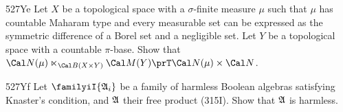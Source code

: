 {\spheader 527Ye Let $X$ be a topological space with a $\sigma$-finite
measure $\mu$ such that $\mu$ has countable Maharam type and every
measurable set can be expressed as the
symmetric difference of a Borel set and a negligible set.   Let
$Y$ be a topological space with a countable $\pi$-base.   Show that
$\Cal N(\mu)\ltimes_{\Cal B(X\times Y)}\Cal M(Y)\prT\Cal N(\mu)\times\Cal N$.

\spheader 527Yf Let $\familyiI{\frak A_i}$ be a family of harmless
Boolean algebras satisfying Knaster's condition,
and $\frak A$ their free product (315I).   Show that $\frak A$ is harmless.

}%

